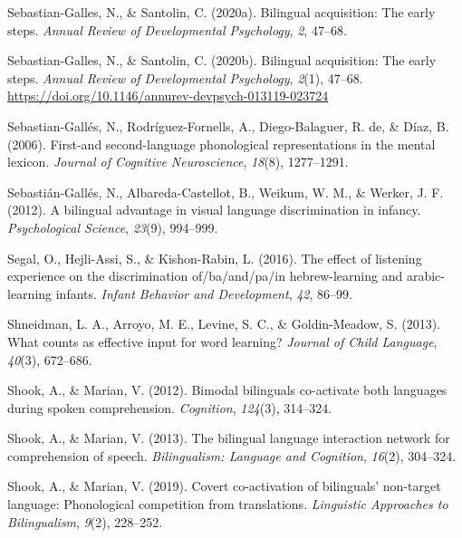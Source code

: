 \documentclass[
  12pt,
  b5paperpaper,
  twoside]{scrreprt}
\newlength{\cslhangindent}
\newlength{\cslentryspacingunit} %
\newenvironment{CSLReferences}[2] %
 {%
  \setlength{\parindent}{0pt}
  \ifodd #1
  \let\oldpar\par
  \def\par{\hangindent=\cslhangindent\oldpar}
  \fi
  \setlength{\parskip}{#2\cslentryspacingunit}
 }%
 {}
\begin{document}
\begin{CSLReferences}{1}{0}
\leavevmode{}%
Sebastian-Galles, N., \& Santolin, C. (2020a). Bilingual acquisition:
The early steps. \emph{Annual Review of Developmental Psychology},
\emph{2}, 47--68.

\leavevmode{}%
Sebastian-Galles, N., \& Santolin, C. (2020b). Bilingual acquisition:
The early steps. \emph{Annual Review of Developmental Psychology},
\emph{2}(1), 47--68.
\url{https://doi.org/10.1146/annurev-devpsych-013119-023724}

\leavevmode{}%
Sebastian-Gallés, N., Rodríguez-Fornells, A., Diego-Balaguer, R. de, \&
Díaz, B. (2006). First-and second-language phonological representations
in the mental lexicon. \emph{Journal of Cognitive Neuroscience},
\emph{18}(8), 1277--1291.

\leavevmode{}%
Sebastián-Gallés, N., Albareda-Castellot, B., Weikum, W. M., \& Werker,
J. F. (2012). A bilingual advantage in visual language discrimination in
infancy. \emph{Psychological Science}, \emph{23}(9), 994--999.

\leavevmode{}%
Segal, O., Hejli-Assi, S., \& Kishon-Rabin, L. (2016). The effect of
listening experience on the discrimination of/ba/and/pa/in
hebrew-learning and arabic-learning infants. \emph{Infant Behavior and
Development}, \emph{42}, 86--99.

\leavevmode{}%
Shneidman, L. A., Arroyo, M. E., Levine, S. C., \& Goldin-Meadow, S.
(2013). What counts as effective input for word learning? \emph{Journal
of Child Language}, \emph{40}(3), 672--686.

\leavevmode{}%
Shook, A., \& Marian, V. (2012). Bimodal bilinguals co-activate both
languages during spoken comprehension. \emph{Cognition}, \emph{124}(3),
314--324.

\leavevmode{}%
Shook, A., \& Marian, V. (2013). The bilingual language interaction
network for comprehension of speech. \emph{Bilingualism: Language and
Cognition}, \emph{16}(2), 304--324.

\leavevmode{}%
Shook, A., \& Marian, V. (2019). Covert co-activation of bilinguals'
non-target language: Phonological competition from translations.
\emph{Linguistic Approaches to Bilingualism}, \emph{9}(2), 228--252.


\end{CSLReferences}
\end{document}

